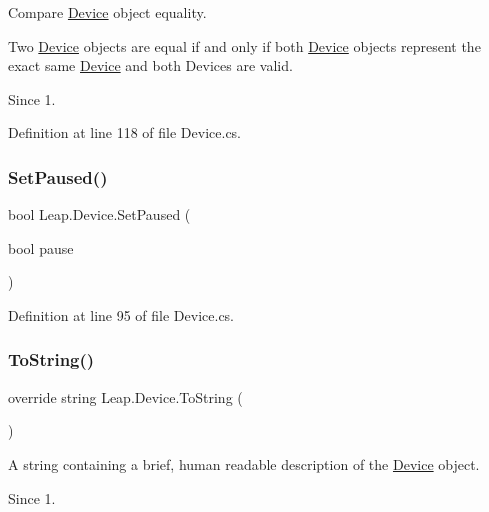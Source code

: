 Compare \mbox{\hyperlink{class_leap_1_1_device}{Device}} object equality. 

Two \mbox{\hyperlink{class_leap_1_1_device}{Device}} objects are equal if and only if both \mbox{\hyperlink{class_leap_1_1_device}{Device}} objects represent the exact same \mbox{\hyperlink{class_leap_1_1_device}{Device}} and both Devices are valid.

\begin{DoxySince}{Since}
1. 
\end{DoxySince}


Definition at line 118 of file Device.\+cs.

\mbox{\label{class_leap_1_1_device_aa3026a1e811bc6a428794c6e98eeab3a}} 
\subsubsection{\texorpdfstring{SetPaused()}{SetPaused()}}
{\footnotesize\ttfamily bool Leap.\+Device.\+Set\+Paused (\begin{DoxyParamCaption}\item[{bool}]{pause }\end{DoxyParamCaption})}



Definition at line 95 of file Device.\+cs.

\mbox{\label{class_leap_1_1_device_a8bff03e26540763986df979439b032e7}} 
\subsubsection{\texorpdfstring{ToString()}{ToString()}}
{\footnotesize\ttfamily override string Leap.\+Device.\+To\+String (\begin{DoxyParamCaption}{ }\end{DoxyParamCaption})}



A string containing a brief, human readable description of the \mbox{\hyperlink{class_leap_1_1_device}{Device}} object. 

\begin{DoxySince}{Since}
1. 
\end{DoxySince}


